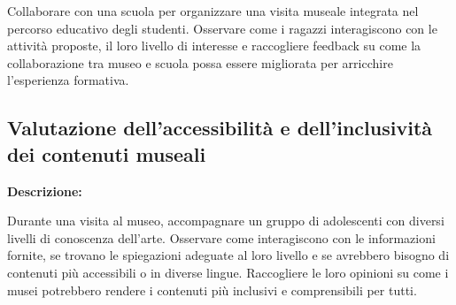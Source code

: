 \documentclass{article}
\begin{document}
Collaborare con una scuola per organizzare una visita museale integrata nel percorso educativo degli studenti. Osservare come i ragazzi interagiscono con le attività proposte, il loro livello di interesse e raccogliere feedback su come la collaborazione tra museo e scuola possa essere migliorata per arricchire l’esperienza formativa.

\subsection{Valutazione dell’accessibilità e dell’inclusività dei contenuti museali}

\textbf{Descrizione:}

Durante una visita al museo, accompagnare un gruppo di adolescenti con diversi livelli di conoscenza dell’arte. Osservare come interagiscono con le informazioni fornite, se trovano le spiegazioni adeguate al loro livello e se avrebbero bisogno di contenuti più accessibili o in diverse lingue. Raccogliere le loro opinioni su come i musei potrebbero rendere i contenuti più inclusivi e comprensibili per tutti.
\end{document}

